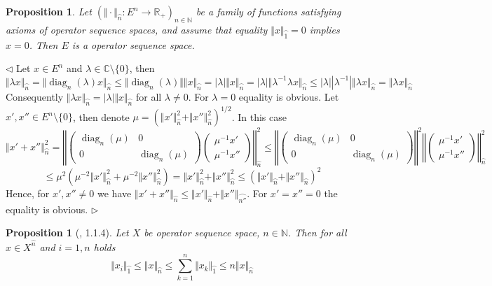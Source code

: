 \documentclass[12pt]{article}
\newtheorem{proposition}[theorem]{Proposition}
\newenvironment{proof}{\par $\triangleleft$}{$\triangleright$}
\begin{document}
\begin{proposition}\label{PrSQAxiomRed}
Let $(\Vert\cdot\Vert_{\wideparen{n}}:E^n\to\mathbb{R}_+)_{n\in\mathbb{N}}$ be a family of functions satisfying axioms of operator sequence spaces, and assume that equality $\Vert x\Vert_{\wideparen{1}}=0$ implies $x=0$. 
Then $E$ is a operator sequence space.
\end{proposition}
\begin{proof}
Let $x\in E^n$ and $\lambda\in \mathbb{C}\setminus\{0\}$, then 
$$
\Vert\lambda x\Vert_{\wideparen{n}}
=\Vert\operatorname{diag}_n(\lambda)x\Vert_{\wideparen{n}}
\leq\Vert\operatorname{diag}_n(\lambda)\Vert\Vert x\Vert_{\wideparen{n}}
=|\lambda|\Vert x\Vert_{\wideparen{n}}
=|\lambda|\Vert\lambda^{-1}\lambda x\Vert_{\wideparen{n}}
\leq|\lambda||\lambda^{-1}|\Vert\lambda x\Vert_{\wideparen{n}}
=\Vert\lambda x\Vert_{\wideparen{n}}
$$
Consequently $\Vert\lambda x\Vert_{\wideparen{n}}=|\lambda|\Vert x\Vert_{\wideparen{n}}$ for all $\lambda\neq 0$. For $\lambda=0$ equality is obvious.
Let $x',x''\in E^n\setminus\{0\}$, then denote $\mu=(\Vert x'\Vert_{\wideparen{n}}^2+\Vert x''\Vert_{\wideparen{n}}^2)^{1/2}$. In this case
$$
\Vert x'+x''\Vert_{\wideparen{n}}^2
=\left\Vert\begin{pmatrix}\operatorname{diag}_n(\mu) & 0\\ 0 & \operatorname{diag}_n(\mu)\end{pmatrix}\begin{pmatrix}\mu^{-1}x'\\ \mu^{-1}x''\end{pmatrix}\right\Vert_{\wideparen{n}}^2
\leq\left\Vert\begin{pmatrix}\operatorname{diag}_n(\mu) & 0\\ 0 & \operatorname{diag}_n(\mu)\end{pmatrix}\right\Vert^2\left\Vert\begin{pmatrix}\mu^{-1}x'\\\mu^{-1}x''\end{pmatrix}\right\Vert_{\wideparen{n}}^2
$$
$$
\leq\mu^2(\mu^{-2}\Vert x'\Vert_{\wideparen{n}}^2+\mu^{-2}\Vert x''\Vert_{\wideparen{n}}^2)=\Vert x'\Vert_{\wideparen{n}}^2+\Vert x''\Vert_{\wideparen{n}}^2\leq (\Vert x'\Vert_{\wideparen{n}}+\Vert x''\Vert_{\wideparen{n}})^2
$$
Hence, for $x',x''\neq 0$ we have $\Vert x'+x''\Vert_{\wideparen{n}}\leq\Vert x'\Vert_{\wideparen{n}}+\Vert x''\Vert_{\wideparen{n''}}$. For $x'=x''=0$ the equality is obvious.
\end{proof}


\begin{proposition}[\cite{LamOpFolgen}, 1.1.4]\label{PrNormVsSQNorm} Let $X$ be operator sequence space, $n\in\mathbb{N}$. Then for all $x\in X^{\wideparen{n}}$ and $i=1,n$ holds
$$
\Vert x_i\Vert_{\wideparen{1}}\leq\Vert x\Vert_{\wideparen{n}}\leq\sum\limits_{k=1}^n\Vert x_k\Vert_{\wideparen{1}}\leq n\Vert x\Vert_{\wideparen{n}}
$$
\end{proposition}
\end{document}
